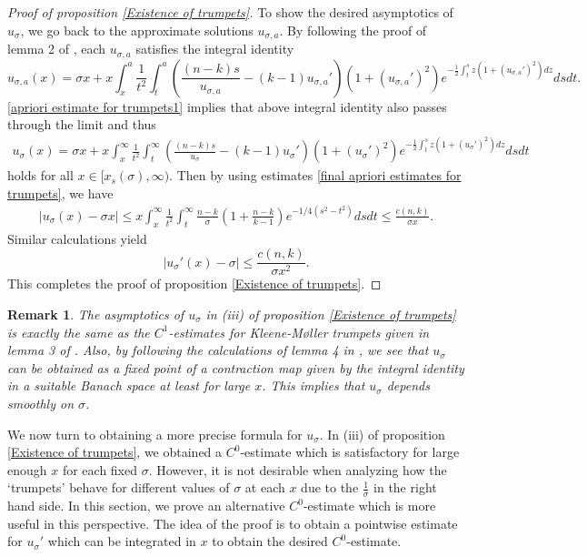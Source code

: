 \documentclass[pdflatex,sn-mathphys-num]{sn-jnl}
\newtheorem{remark}[theorem]{Remark}
\begin{document}
\begin{proof}[Proof of proposition \ref{Existence of trumpets}]
To show the desired asymptotics of $u_{\sigma}$, we go back to the approximate solutions $u_{\sigma, a}$. By following the proof of lemma 2 of \cite{KM}, each $u_{\sigma, a}$ satisfies the integral identity
    $$u_{\sigma, a}(x) = \sigma x + x\int_{x}^{a}\frac{1}{t^2}\int_{t}^{a}(\frac{(n-k)s}{u_{\sigma, a}} - (k-1)u_{\sigma, a}')(1 + (u_{\sigma, a}')^2)e^{-\frac{1}{2}\int_{t}^{s}z(1 + (u_{\sigma, a}')^2)dz}dsdt.$$
     \eqref{apriori estimate for trumpets1} implies that above integral identity also passes through the limit and thus
 \begin{align*}
     u_{\sigma}(x) = \sigma x + x\int_{x}^{\infty}\frac{1}{t^2}\int_{t}^{\infty}(\frac{(n-k)s}{u_{\sigma}} - (k-1)u_{\sigma}')(1 + (u_{\sigma}')^2)e^{-\frac{1}{2}\int_{t}^{s}z(1 + (u_{\sigma}')^2)dz}dsdt
 \end{align*}
    holds for all $x\in [x_{s}(\sigma), \infty)$. Then by using estimates \eqref{final apriori estimates for trumpets}, we have 
 \begin{align*}
     |u_{\sigma}(x) - \sigma x| \leq x\int_{x}^{\infty}\frac{1}{t^2}\int_{t}^{\infty}\frac{n-k}{\sigma}(1 + \frac{n-k}{k-1})e^{-1/4(s^2 - t^2)}dsdt \leq \frac{c(n,k)}{\sigma x}.
 \end{align*}
    Similar calculations yield 
    \begin{equation}
        |u_{\sigma}'(x) - \sigma| \leq \frac{c(n,k)}{\sigma x^2}.
    \end{equation}
    This completes the proof of proposition \ref{Existence of trumpets}.
\end{proof}
\begin{remark}\label{smooth dependence of trumpets on slope}
    The asymptotics of $u_{\sigma}$ in (iii) of proposition \ref{Existence of trumpets} is exactly the same as the $C^1$-estimates for Kleene-M\o ller trumpets given in lemma 3 of \cite{KM}. Also, by following the calculations of lemma 4 in \cite{KM}, we see that $u_{\sigma}$ can be obtained as a fixed point of a contraction map given by the integral identity in a suitable Banach space at least for large $x$.  This implies that $u_{\sigma}$ depends smoothly on $\sigma$.
\end{remark}
We now turn to obtaining a more precise formula for $u_{\sigma}$. 
In (iii) of proposition \ref{Existence of trumpets}, we obtained a $C^0$-estimate which is satisfactory for large enough $x$ for each fixed $\sigma$. However, it is not desirable when analyzing how the `trumpets' behave for different values of $\sigma$ at each $x$ due to the $\frac{1}{\sigma}$ in the right hand side. In this section, we prove an alternative $C^0$-estimate which is more useful in this perspective. The idea of the proof is to obtain a pointwise estimate for $u_{\sigma}'$ which can be integrated in $x$ to obtain the desired $C^0$-estimate. 
\end{document}
